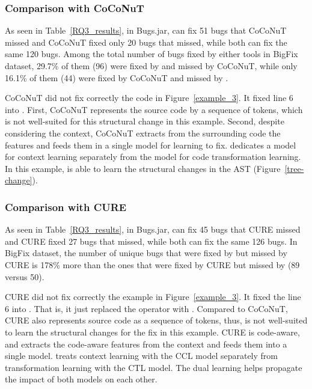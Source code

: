 \subsubsection{\bf Comparison with CoCoNuT}

As seen in Table~\ref{RQ3_results}, in Bugs\-.jar, {\tool} can fix 51
bugs that CoCoNuT missed and CoCoNuT fixed only 20 bugs that {\tool}
missed, while both can fix the same 120 bugs. Among the total
number of bugs fixed by either tools in BigFix dataset, 29.7\% of them (96)
were fixed by {\tool} and missed by CoCoNuT, while only 16.1\% of them (44)
were fixed by CoCoNuT and missed by {\tool}.

CoCoNuT did not fix correctly the code in Figure~\ref{example_3}.  It
fixed line 6 into   
. First, CoCoNuT represents the source code by a
sequence of tokens, which is not well-suited for this structural
change in this example. Second, despite considering the context,
CoCoNuT extracts from the surrounding code the features and feeds them
in a single model for learning to fix. {\tool} dedicates a model for
context learning separately from the model for code transformation
learning. In this example, {\tool} is able to learn the structural
changes in the AST (Figure~\ref{tree-change}).

\subsubsection{\bf Comparison with CURE}

As seen in Table~\ref{RQ3_results}, in Bugs.jar, {\tool} can fix 45
bugs that CURE missed and CURE fixed 27 bugs that {\tool} missed,
while both can fix the same 126 bugs. In BigFix dataset, the number of
unique bugs that were fixed by {\tool} but missed by CURE is 178\%
more than the ones that were fixed by CURE but missed by {\tool} (89
versus 50).

CURE did not fix correctly the example in Figure~\ref{example_3}. It
fixed the line 6 into  
  \code{/} .
That is, it just replaced the operator \code{\%} with \code{/}.
Compared to CoCoNuT, CURE also represents source code as a sequence of
tokens, thus, is not well-suited to learn the structural changes for
the fix in this example. CURE is code-aware,
and extracts the code-aware features from the context and feeds them
into a single model. {\tool} treats context learning with the CCL
model separately from transformation learning with the CTL model.
The dual learning helps propagate the impact of both models on each other.

